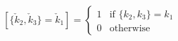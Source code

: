 $$[\{\check{k}_2, \check{k}_3\} = \check{k}_1] = \begin{cases} 1 & \text{if } \{k_2, k_3\} = k_1 \\ 0 & \text{otherwise} \end{cases}$$
